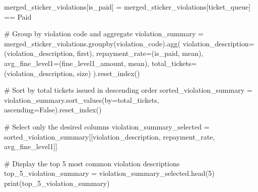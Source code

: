 \documentclass[
  letterpaper,
  DIV=11,
  numbers=noendperiod]{scrartcl}
\newenvironment{Shaded}{\begin{snugshade}}{\end{snugshade}}
\newcommand{\BuiltInTok}[1]{\textcolor[rgb]{0.00,0.23,0.31}{#1}}
\newcommand{\CommentTok}[1]{\textcolor[rgb]{0.37,0.37,0.37}{#1}}
\newcommand{\DecValTok}[1]{\textcolor[rgb]{0.68,0.00,0.00}{#1}}
\newcommand{\NormalTok}[1]{\textcolor[rgb]{0.00,0.23,0.31}{#1}}
\newcommand{\OperatorTok}[1]{\textcolor[rgb]{0.37,0.37,0.37}{#1}}
\newcommand{\StringTok}[1]{\textcolor[rgb]{0.13,0.47,0.30}{#1}}
\newcommand{\VariableTok}[1]{\textcolor[rgb]{0.07,0.07,0.07}{#1}}
\begin{document}
\begin{Shaded}
\begin{Highlighting}[]
\NormalTok{merged\_sticker\_violations[}\StringTok{\textquotesingle{}is\_paid\textquotesingle{}}\NormalTok{] }\OperatorTok{=}\NormalTok{ merged\_sticker\_violations[}\StringTok{\textquotesingle{}ticket\_queue\textquotesingle{}}\NormalTok{] }\OperatorTok{==} \StringTok{\textquotesingle{}Paid\textquotesingle{}}

\CommentTok{\# Group by violation code and aggregate}
\NormalTok{violation\_summary }\OperatorTok{=}\NormalTok{ merged\_sticker\_violations.groupby(}\StringTok{\textquotesingle{}violation\_code\textquotesingle{}}\NormalTok{).agg(}
\NormalTok{    violation\_description}\OperatorTok{=}\NormalTok{(}\StringTok{\textquotesingle{}violation\_description\textquotesingle{}}\NormalTok{, }\StringTok{\textquotesingle{}first\textquotesingle{}}\NormalTok{),}
\NormalTok{    repayment\_rate}\OperatorTok{=}\NormalTok{(}\StringTok{\textquotesingle{}is\_paid\textquotesingle{}}\NormalTok{, }\StringTok{\textquotesingle{}mean\textquotesingle{}}\NormalTok{),}
\NormalTok{    avg\_fine\_level1}\OperatorTok{=}\NormalTok{(}\StringTok{\textquotesingle{}fine\_level1\_amount\textquotesingle{}}\NormalTok{, }\StringTok{\textquotesingle{}mean\textquotesingle{}}\NormalTok{),}
\NormalTok{    total\_tickets}\OperatorTok{=}\NormalTok{(}\StringTok{\textquotesingle{}violation\_description\textquotesingle{}}\NormalTok{, }\StringTok{\textquotesingle{}size\textquotesingle{}}\NormalTok{)}
\NormalTok{).reset\_index()}

\CommentTok{\# Sort by total tickets issued in descending order}
\NormalTok{sorted\_violation\_summary }\OperatorTok{=}\NormalTok{ violation\_summary.sort\_values(by}\OperatorTok{=}\StringTok{\textquotesingle{}total\_tickets\textquotesingle{}}\NormalTok{, ascending}\OperatorTok{=}\VariableTok{False}\NormalTok{).reset\_index()}

\CommentTok{\# Select only the desired columns}
\NormalTok{violation\_summary\_selected }\OperatorTok{=}\NormalTok{ sorted\_violation\_summary[[}\StringTok{\textquotesingle{}violation\_description\textquotesingle{}}\NormalTok{, }\StringTok{\textquotesingle{}repayment\_rate\textquotesingle{}}\NormalTok{, }\StringTok{\textquotesingle{}avg\_fine\_level1\textquotesingle{}}\NormalTok{]]}

\CommentTok{\# Display the top 5 most common violation descriptions}
\NormalTok{top\_5\_violation\_summary }\OperatorTok{=}\NormalTok{ violation\_summary\_selected.head(}\DecValTok{5}\NormalTok{)}
\BuiltInTok{print}\NormalTok{(top\_5\_violation\_summary)}
\end{Highlighting}
\end{Shaded}
\end{document}
